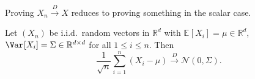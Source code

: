 \begin{remark}
	Proving \(X_n \overset{D}{\to} X\) reduces to proving something in the scalar case.
\end{remark}

\begin{theorem}\label{thm:multivariate-CLT}
	Let \((X_n)\) be i.i.d.\ random vectors in \(\mathbb{R} ^d\) with \(\mathbb{E}_{}[X_i] = \mu \in \mathbb{R} ^d\), \(\Var_{}[X_i] = \Sigma \in \mathbb{R} ^{d \times d}\) for all \(1 \leq i \leq n\). Then
	\[
		\frac{1}{\sqrt{n} } \sum_{i=1}^{n} (X_i - \mu )
		\overset{D}{\to} \mathcal{N} (0, \Sigma ).
	\]
\end{theorem}